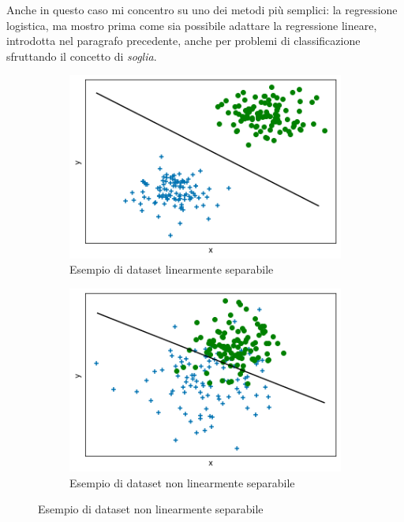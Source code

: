 \documentclass[../../main.tex]{subfiles}
\begin{document}
    Anche in questo caso mi concentro su uno dei metodi più semplici: la regressione logistica, ma mostro prima come sia possibile adattare la regressione lineare, introdotta nel paragrafo precedente, anche per problemi di classificazione sfruttando il concetto di \textit{soglia}.

    \begin{figure}[H]
        \begin{subfigure}[]{0.49\textwidth}
            \centering
            \includegraphics[width=\textwidth]{immagini/4_1/class_linearly_separable.png} 
            \caption{Esempio di dataset linearmente separabile}
            \label{fig:linearly_sep_classification}      
        \end{subfigure}
        \begin{subfigure}[]{0.49\textwidth}
            \centering
            \includegraphics[width=\textwidth]{immagini/4_1/class_non_linearly_separable.png}    
            \caption{Esempio di dataset non linearmente separabile}
            \label{fig:non_linearly_sep_classification}    
        \end{subfigure}
        
    \end{figure}
\end{document}
